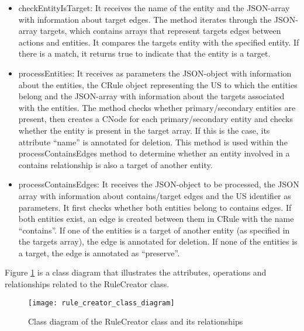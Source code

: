 \begin{itemize}
	\item checkEntityIsTarget: It receives the name of the entity and the JSON-array with information about target edges. The method iterates through the JSON-array targets, which contains arrays that represent targets edges between actions and entities. It compares the targets entity with the specified entity. If there is a match, it returns true to indicate that the entity is a target.
	
	\item processEntities: It receives as parameters the JSON-object with information about the entities, the CRule object representing the US to which the entities belong and the JSON-array with information about the targets associated with the entities. The method checks whether primary/secondary entities are present, then creates a CNode for each primary/secondary entity and checks whether the entity is present in the target array. If this is the case, its attribute \enquote{name} is annotated for deletion. This method is used within the processContainsEdges method to determine whether an entity involved in a contains relationship is also a target of another entity.
	
	\item processContainsEdges: It receives the JSON-object to be processed, the JSON array with information about contains/target edges and the US identifier as parameters. It first checks whether both entities belong to contains edges. If both entities exist, an edge is created between them in CRule with the name \enquote{contains}. If one of the entities is a target of another entity (as specified in the targets array), the edge is annotated for deletion. If none of the entities is a target, the edge is annotated as \enquote{preserve}.
	
\end{itemize}
Figure \ref{fig:rule_creator_class_diagram} is a class diagram that illustrates the attributes, operations and relationships related to the RuleCreator class.
\begin{figure}[h]
	\centering
	\texttt{[image: rule\_creator\_class\_diagram]}
	\caption{Class diagram of the RuleCreator class and its relationships}\label{fig:rule_creator_class_diagram}
\end{figure}
